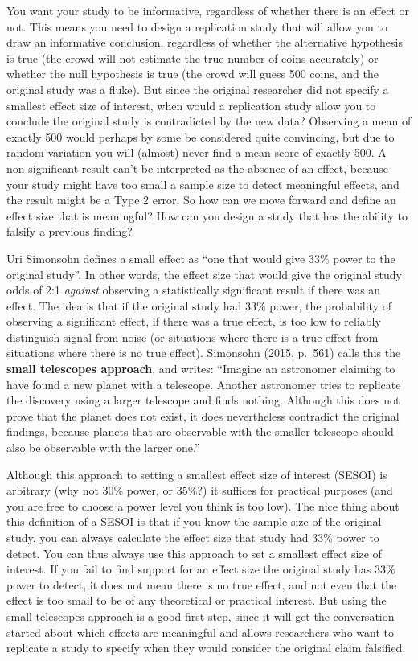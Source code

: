 \documentclass[
  oneside]{book}
\begin{document}
You want your study to be informative, regardless of whether there is an effect or not. This means you need to design a replication study that will allow you to draw an informative conclusion, regardless of whether the alternative hypothesis is true (the crowd will not estimate the true number of coins accurately) or whether the null hypothesis is true (the crowd will guess 500 coins, and the original study was a fluke). But since the original researcher did not specify a smallest effect size of interest, when would a replication study allow you to
conclude the original study is contradicted by the new data? Observing a mean of exactly 500 would perhaps by some be considered quite convincing, but due to random variation you will (almost) never find a mean score of exactly 500. A non-significant result can't be interpreted as the absence of an effect, because your study might have too small a sample size to detect meaningful effects, and the result might be a Type 2 error. So how can we move forward and define an effect size that is meaningful? How can you design a study that has the ability to falsify a previous finding?

Uri Simonsohn \citeyearpar{simonsohn_small_2015} defines a small effect as ``one that would give 33\% power to the original study''. In other words, the effect size that would give the original study odds of 2:1 \emph{against} observing a statistically significant result if there was an effect. The idea is that if the original study had 33\% power, the probability of observing a significant effect, if there was a true effect, is too low to reliably distinguish signal from noise (or situations where there is a true effect from situations where there is no true effect). Simonsohn (2015, p.~561) calls this the \textbf{small telescopes approach}, and writes: ``Imagine an astronomer claiming to have found a new planet with a telescope. Another astronomer tries to replicate the discovery using a larger telescope and finds nothing. Although this does not prove that the planet does not exist, it does nevertheless contradict the original findings, because planets that are observable with the smaller telescope should also be observable with the larger one.''

Although this approach to setting a smallest effect size of interest (SESOI) is arbitrary (why not 30\% power, or 35\%?) it suffices for practical purposes (and you are free to choose a power level you think is too low). The nice thing about this definition of a SESOI is that if you know the sample size of the original study, you can always calculate the effect size that study had 33\% power to detect. You can thus always use this approach to set a smallest effect size of interest. If you fail to find support for an effect size the original study has 33\% power to detect, it does not mean there is no true effect, and not even that the effect is too small to be of any theoretical or practical interest. But using the small telescopes approach is a good first step, since it will get the conversation started about which effects are meaningful and allows researchers who want to replicate a study to specify when they would consider the original claim falsified.
\end{document}
